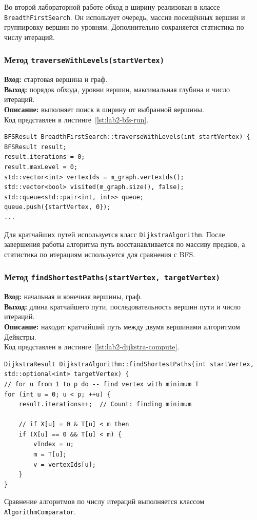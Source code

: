 \documentclass[14pt,a4paper]{extarticle}
\newcommand{\funcblock}[5]{%
\subsubsection*{Метод \code{#1}}
\noindent
\textbf{Вход:} #2\\
\textbf{Выход:} #3\\
\textbf{Описание:} #4\\
Код представлен в листинге~\ref{#5}.%
}
\newcommand{\code}[1]{\texttt{#1}}
\begin{document}
Во второй лабораторной работе обход в ширину реализован в классе \code{BreadthFirstSearch}. Он использует очередь, массив посещённых вершин и группировку вершин по уровням. Дополнительно сохраняется статистика по числу итераций.

\funcblock
{traverseWithLevels(startVertex)}
{стартовая вершина и граф.}
{порядок обхода, уровни вершин, максимальная глубина и число итераций.}
{выполняет поиск в ширину от выбранной вершины.}
{lst:lab2-bfs-run}
\begin{lstlisting}[style=cppcode,caption={Фрагмент функции \code{traverseWithLevels(startVertex)}},label={lst:lab2-bfs-run}]
BFSResult BreadthFirstSearch::traverseWithLevels(int startVertex) {
BFSResult result;
result.iterations = 0;
result.maxLevel = 0;
std::vector<int> vertexIds = m_graph.vertexIds();
std::vector<bool> visited(m_graph.size(), false);
std::queue<std::pair<int, int>> queue;
queue.push({startVertex, 0});
...
\end{lstlisting}

Для кратчайших путей используется класс \code{DijkstraAlgorithm}. После завершения работы алгоритма путь восстанавливается по массиву предков, а статистика по итерациям используется для сравнения с BFS.

\funcblock
{findShortestPaths(startVertex, targetVertex)}
{начальная и конечная вершины, граф.}
{длина кратчайшего пути, последовательность вершин пути и число итераций.}
{находит кратчайший путь между двумя вершинами алгоритмом Дейкстры.}
{lst:lab2-dijkstra-compute}
\begin{lstlisting}[style=cppcode,caption={Фрагмент функции \code{findShortestPaths(startVertex, targetVertex)}},label={lst:lab2-dijkstra-compute}]
DijkstraResult DijkstraAlgorithm::findShortestPaths(int startVertex, std::optional<int> targetVertex) {
// for u from 1 to p do -- find vertex with minimum T
for (int u = 0; u < p; ++u) {
    result.iterations++;  // Count: finding minimum

    // if X[u] = 0 & T[u] < m then
    if (X[u] == 0 && T[u] < m) {
        vIndex = u;
        m = T[u];
        v = vertexIds[u];
    }
}
\end{lstlisting}

Сравнение алгоритмов по числу итераций выполняется классом \code{AlgorithmComparator}.
\end{document}

